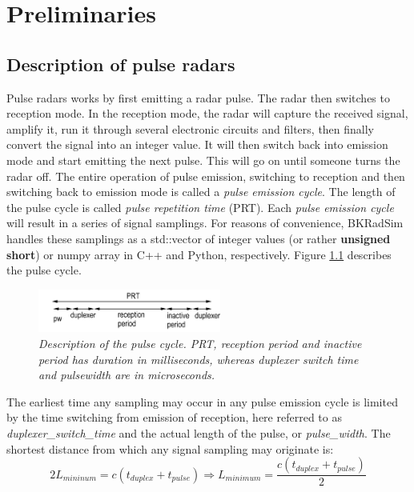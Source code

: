 \documentclass[letterpaper]{book}
\begin{document}
\chapter{Preliminaries}

\section{Description of pulse radars}
Pulse radars works by first emitting a radar pulse. The radar then switches to reception mode. In the reception mode, the radar will capture the received signal, amplify it, run it through several electronic circuits and filters, then finally convert the signal into an integer value. It will then switch back into emission mode and start emitting the next pulse. This will go on until someone turns the radar off. The entire operation of pulse emission, switching to reception and then switching back to emission mode is called a \textit{pulse emission cycle}. The length of the pulse cycle is called \textit{pulse repetition time} (PRT). Each \textit{pulse emission cycle} will result in a series of signal samplings. For reasons of convenience, BKRadSim handles these samplings as a std::vector of integer values (or rather \textbf{unsigned short}) or numpy array in C++ and Python, respectively. Figure \ref{fig:timescale} describes the pulse cycle. 

\begin{figure}
  \includegraphics[width=6cm]{timescales.png}
  \caption{\textit{Description of the pulse cycle. PRT, reception period and inactive period has duration in milliseconds, whereas duplexer switch time and pulsewidth are in microseconds.}}
  \label{fig:timescale}
\end{figure}

The earliest time any sampling may occur in any pulse emission cycle is limited by the time switching from emission of reception, here referred to as \textit{duplexer\_switch\_time} and the actual length of the pulse, or \textit{pulse\_width}. The shortest distance from which any signal sampling may originate is:
\begin{equation}
2L_{mininum}=c(t_{duplex} + t_{pulse}) \Rightarrow L_{minimum}=\frac{ c(t_{duplex}+t_{pulse}) }{2}
\end{equation}
\end{document}
